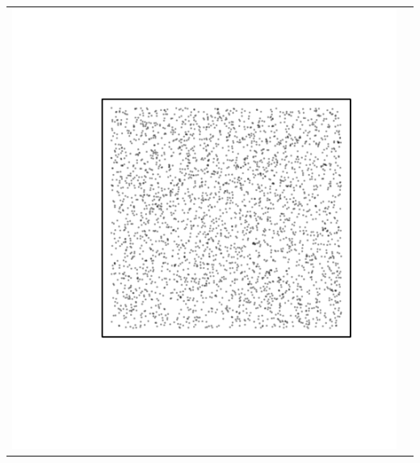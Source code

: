 \documentclass{article}\usepackage{graphicx, color}
\makeatletter
\def\maxwidth{ %
  \ifdim\Gin@nat@width>\linewidth
    \linewidth
  \else
    \Gin@nat@width
  \fi
}
\newenvironment{knitrout}{}{} %
\makeatother
\begin{document}
\vspace*{-1.75in}
\begin{tabular}{cc}
\begin{knitrout}
\definecolor{shadecolor}{rgb}{0.969, 0.969, 0.969}\color{fgcolor}\includegraphics[width=\maxwidth]{figure/unnamed-chunk-5} 
\end{knitrout}


\end{tabular}
\end{document}
